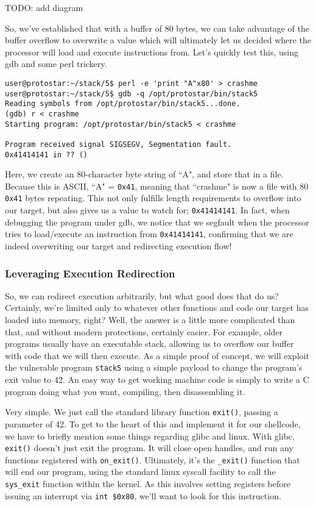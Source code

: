 TODO: add diagram

So, we've established that with a buffer of 80 bytes, we can take advantage of the buffer overflow
to overwrite a value which will ultimately let us decided where the processor will load and
execute instructions from. Let's quickly test this, using gdb and some perl trickery.

\begin{lstlisting}
user@protostar:~/stack/5$ perl -e 'print "A"x80' > crashme
user@protostar:~/stack/5$ gdb -q /opt/protostar/bin/stack5
Reading symbols from /opt/protostar/bin/stack5...done.
(gdb) r < crashme
Starting program: /opt/protostar/bin/stack5 < crashme

Program received signal SIGSEGV, Segmentation fault.
0x41414141 in ?? ()
\end{lstlisting}
Here, we create an 80-character byte string of ``A", and store that in a file. Because this is ASCII,
``A" = \texttt{0x41}, meaning that ``crashme" is now a file with 80 \texttt{0x41} bytes repeating. This
not only fulfills length requirements to overflow into our target, but also gives us a value to
watch for; \texttt{0x41414141}. In fact, when debugging the program under gdb, we notice that
we segfault when the processor tries to load/execute an instruction from \texttt{0x41414141}, confirming
that we are indeed overwriting our target and redirecting execution flow!

\subsubsection{Leveraging Execution Redirection}
So, we can redirect execution arbitrarily, but what good does that do us? Certainly, we're limited only to
whatever other functions and code our target has loaded into memory, right? Well, the answer is a little
more complicated than that, and without modern protections, certainly easier. For example, older
programs usually have an executable stack, allowing us to overflow our buffer with code that we will
then execute. As a simple proof of concept, we will exploit the vulnerable program \texttt{stack5}
using a simple payload to change the program's exit value to 42. An easy way to get working machine
code is simply to write a C program doing what you want, compiling, then disassembling it.



Very simple. We just call the standard library function \texttt{exit()}, passing a parameter of 42.
To get to the heart of this and implement it for our shellcode, we have to briefly mention
some things regarding glibc and linux. With glibc, \texttt{exit()} doesn't just exit the program.
It will close open handles, and run any functions registered with \texttt{on\_exit()}. Ultimately,
it's the \texttt{\_exit()} function that will end our program, using the standard linux syscall
facility to call the \texttt{sys\_exit} function within the kernel. As this involves setting
registers before issuing an interrupt via \texttt{int \$0x80}, we'll want to look for this instruction.

